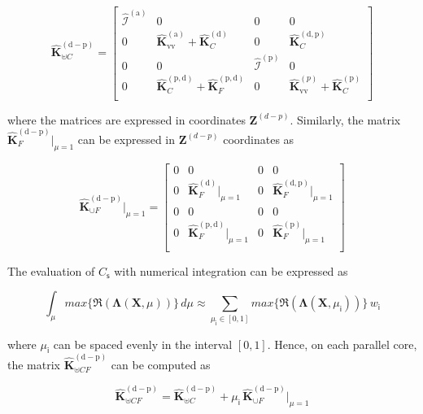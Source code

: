  \begin{equation}
 \mathbf{\hat{K}}^{\mathrm{(d-p)}}_{\uplus C}=\left[
\begin{array}{cccc}
  \mathcal{\hat I}^{(\mathrm a)} &0&0&0\\
  0&\mathbf{\hat{K}}_{\mathrm{vv}}^{(\mathrm a)}+ {{\mathbf{\hat K}}}^{\mathrm{(\mathrm d)}}_C&0&{{\mathbf{\hat K}}}^{\mathrm{(d,p)}}_C \\
  0&0& \mathcal{\hat I}^{(\mathrm p)} &0 \\
  0& {{\mathbf{\hat K}}}^{\mathrm{(p,d)}}_C+{{\mathbf{\hat K}}}^{\mathrm{(p,d)}}_F&0&\mathbf{\hat{K}}_{\mathrm{vv}}^{(p)}+ {{\mathbf{\hat K}}}^{\mathrm{(p)}}_C\\
\end{array}
\right] 
 \end{equation}
 
 
 where the matrices are expressed in coordinates $\mathbf{Z}^{(d-p)}$. Similarly, the matrix $\mathbf{\hat{K}}^{\mathrm{(d-p)}}_F|_{\mu=1}$ can be expressed in  $\mathbf{Z}^{(d-p)}$ coordinates as
 
  \begin{equation}
 \mathbf{\hat{K}}^{\mathrm{(d-p)}}_{\cup F}|_{\mu=1}=\left[
\begin{array}{cccc}
0&0&0&0\\
0& {{\mathbf{\hat K}}}^{\mathrm{(d)}}_F|_{\mu=1}&0& {{\mathbf{\hat K}}}^{\mathrm{(d,p)}}_F|_{\mu=1}\\
0&0&0&0\\
0& {{\mathbf{\hat K}}}^{\mathrm{(p,d)}}_F|_{\mu=1}&0& {{\mathbf{\hat K}}}^{\mathrm{(p)}}_F|_{\mu=1}\\
\end{array}
\right] 
 \end{equation}

The evaluation of $C_{\mathsf s}$ with numerical integration can be expressed as

\begin{equation}
\int_{{\mu}}max\{\Re(\bm \Lambda(\bm X,{\mu}))\}\,d{\mu} \approx \sum_{{\mu}_{\mathsf i}\in [0,1]}max\{\Re(\bm \Lambda(\bm X,{\mu}_{\mathsf i}))\}\,w_{{\mathsf i}}
\end{equation}

where ${\mu}_{\mathsf i}$ can be spaced evenly in the interval $[0,1]$. Hence, on each parallel core, the matrix $ \mathbf{\hat{K}}^{\mathrm{(d-p)}}_{\uplus CF}$ can be computed as

\begin{equation}
\mathbf{\hat{K}}^{\mathrm{(d-p)}}_{\uplus CF} =  \mathbf{\hat{K}}^{\mathrm{(d-p)}}_{\uplus C}+\mu_{\mathsf i} \,\mathbf{\hat{K}}^{\mathrm{(d-p)}}_{\cup F}|_{\mu=1}
\end{equation}

